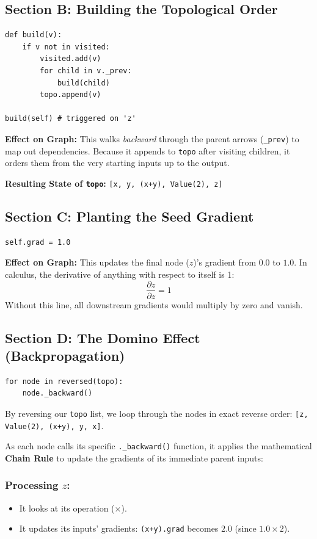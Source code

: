 \documentclass[11pt,a4paper]{article}
\begin{document}
\subsection*{Section B: Building the Topological Order}
\begin{lstlisting}
def build(v):
    if v not in visited:
        visited.add(v)
        for child in v._prev:
            build(child)
        topo.append(v)

build(self) # triggered on 'z'
\end{lstlisting}
\textbf{Effect on Graph:} This walks \textit{backward} through the parent arrows (\texttt{\_prev}) to map out dependencies. Because it appends to \texttt{topo} after visiting children, it orders them from the very starting inputs up to the output.

\noindent \textbf{Resulting State of \texttt{topo}:} \texttt{[x, y, (x+y), Value(2), z]}

\subsection*{Section C: Planting the Seed Gradient}
\begin{lstlisting}
self.grad = 1.0
\end{lstlisting}
\textbf{Effect on Graph:} This updates the final node ($z$)'s gradient from $0.0$ to $1.0$. In calculus, the derivative of anything with respect to itself is 1:
\begin{equation*}
    \frac{\partial z}{\partial z} = 1
\end{equation*}
Without this line, all downstream gradients would multiply by zero and vanish.

\subsection*{Section D: The Domino Effect (Backpropagation)}
\begin{lstlisting}
for node in reversed(topo):
    node._backward()
\end{lstlisting}
By reversing our \texttt{topo} list, we loop through the nodes in exact reverse order: \texttt{[z, Value(2), (x+y), y, x]}.

As each node calls its specific \texttt{.\_backward()} function, it applies the mathematical \textbf{Chain Rule} to update the gradients of its immediate parent inputs:

\subsubsection*{Processing $z$:}
\begin{itemize}
    \item It looks at its operation ($\times$).
    \item It updates its inputs' gradients: \texttt{(x+y).grad} becomes $2.0$ (since $1.0 \times 2$).
\end{itemize}
\end{document}
